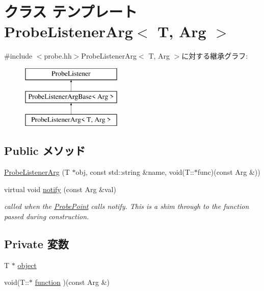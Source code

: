 \hypertarget{classProbeListenerArg}{
\section{クラス テンプレート ProbeListenerArg$<$ T, Arg $>$}
\label{classProbeListenerArg}
}


{\ttfamily \#include $<$probe.hh$>$}ProbeListenerArg$<$ T, Arg $>$に対する継承グラフ:\begin{figure}[H]
\begin{center}
\leavevmode
\includegraphics[height=3cm]{classProbeListenerArg}
\end{center}
\end{figure}
\subsection*{Public メソッド}
\begin{DoxyCompactItemize}
\item 
\hyperlink{classProbeListenerArg_a2697379aed3ebe21258278e8f06ae6ac}{ProbeListenerArg} (T $\ast$obj, const std::string \&name, void(T::$\ast$func)(const Arg \&))
\item 
virtual void \hyperlink{classProbeListenerArg_a03fbf8d00c9fe34c7f9ec78f46c3f621}{notify} (const Arg \&val)
\begin{DoxyCompactList}\small\item\em called when the \hyperlink{classProbePoint}{ProbePoint} calls notify. This is a shim through to the function passed during construction. \item\end{DoxyCompactList}\end{DoxyCompactItemize}
\subsection*{Private 変数}
\begin{DoxyCompactItemize}
\item 
T $\ast$ \hyperlink{classProbeListenerArg_acd5a12b9b1a75e37fd605accfe038a03}{object}
\item 
void(T::$\ast$ \hyperlink{classProbeListenerArg_a7997c1131eac35b9de8d4e11b49ce2af}{function} )(const Arg \&)
\end{DoxyCompactItemize}


